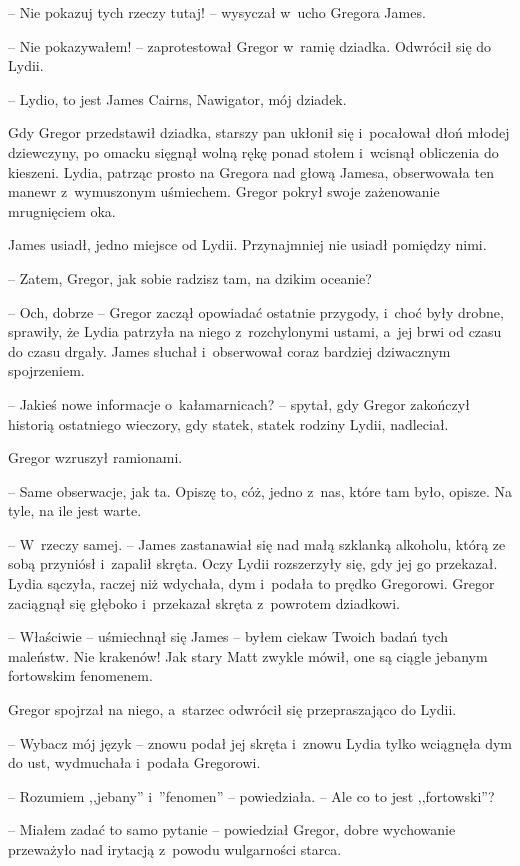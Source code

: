 \documentclass[oneside,polish,12pt,sfheadings]{mwbk}
\begin{document}
-- Nie pokazuj tych rzeczy tutaj! -- wysyczał w~ucho Gregora James.

-- Nie pokazywałem! -- zaprotestował Gregor w~ramię dziadka. Odwrócił się
do Lydii.

-- Lydio, to jest James Cairns, Nawigator, mój dziadek.

Gdy Gregor przedstawił dziadka, starszy pan ukłonił się i~pocałował dłoń
młodej dziewczyny, po omacku sięgnął wolną rękę ponad stołem i~wcisnął
obliczenia do kieszeni. Lydia, patrząc prosto na Gregora nad głową
Jamesa, obserwowała ten manewr z~wymuszonym uśmiechem. Gregor pokrył
swoje zażenowanie mrugnięciem oka.

James usiadł, jedno miejsce od Lydii. Przynajmniej nie usiadł pomiędzy
nimi.

-- Zatem, Gregor, jak sobie radzisz tam, na dzikim oceanie?

-- Och, dobrze -- Gregor zaczął opowiadać ostatnie przygody, i~choć były
drobne, sprawiły, że Lydia patrzyła na niego z~rozchylonymi ustami, a~jej brwi od czasu do czasu drgały. James słuchał i~obserwował coraz
bardziej dziwacznym spojrzeniem.

-- Jakieś nowe informacje o~kałamarnicach? -- spytał, gdy Gregor zakończył
historią ostatniego wieczory, gdy statek, statek rodziny Lydii,
nadleciał.

Gregor wzruszył ramionami. 

-- Same obserwacje, jak ta. Opiszę to, cóż,
jedno z~nas, które tam było, opisze. Na tyle, na ile jest warte.

-- W~rzeczy samej. -- James zastanawiał się nad małą szklanką alkoholu,
którą ze sobą przyniósł i~zapalił skręta. Oczy Lydii rozszerzyły się,
gdy jej go przekazał. Lydia sączyła, raczej niż wdychała, dym i~podała
to prędko Gregorowi. Gregor zaciągnął się głęboko i~przekazał skręta z~powrotem dziadkowi.

-- Właściwie -- uśmiechnął się James -- byłem ciekaw Twoich badań tych
maleństw. Nie krakenów! Jak stary Matt zwykle mówił, one są ciągle
jebanym fortowskim fenomenem.

Gregor spojrzał na niego, a~starzec odwrócił się przepraszająco do
Lydii. 

-- Wybacz mój język -- znowu podał jej skręta i~znowu Lydia tylko
wciągnęła dym do ust, wydmuchała i~podała Gregorowi.

-- Rozumiem ,,jebany'' i~''fenomen'' -- powiedziała. -- Ale co to jest
,,fortowski''?

-- Miałem zadać to samo pytanie -- powiedział Gregor, dobre wychowanie
przeważyło nad irytacją z~powodu wulgarności starca.
\end{document}
